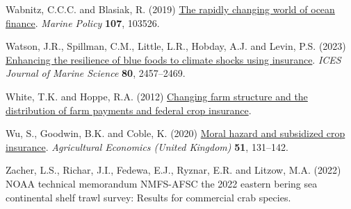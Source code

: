 \documentclass[
  letterpaper,
  DIV=11,
  numbers=noendperiod]{scrartcl}
\newlength{\cslhangindent}
\newlength{\cslentryspacingunit} %
\newenvironment{CSLReferences}[2] %
 {%
  \setlength{\parindent}{0pt}
  \ifodd #1
  \let\oldpar\par
  \def\par{\hangindent=\cslhangindent\oldpar}
  \fi
  \setlength{\parskip}{#2\cslentryspacingunit}
 }%
 {}
\theoremstyle{plain}
\theoremstyle{plain}
\theoremstyle{remark}
\begin{document}
\begin{CSLReferences}{1}{0}
\leavevmode{}%
Wabnitz, C.C.C. and Blasiak, R. (2019)
\href{https://doi.org/10.1016/j.marpol.2019.103526}{The rapidly changing
world of ocean finance}. \emph{Marine Policy} \textbf{107}, 103526.

\leavevmode{}%
Watson, J.R., Spillman, C.M., Little, L.R., Hobday, A.J. and Levin, P.S.
(2023) \href{https://doi.org/10.1093/icesjms/fsad175}{Enhancing the
resilience of blue foods to climate shocks using insurance}. \emph{ICES
Journal of Marine Science} \textbf{80}, 2457--2469.

\leavevmode{}%
White, T.K. and Hoppe, R.A. (2012)
\href{https://www.ers.usda.gov}{Changing farm structure and the
distribution of farm payments and federal crop insurance}.

\leavevmode{}%
Wu, S., Goodwin, B.K. and Coble, K. (2020)
\href{https://doi.org/10.1111/agec.12545}{Moral hazard and subsidized
crop insurance}. \emph{Agricultural Economics (United Kingdom)}
\textbf{51}, 131--142.

\leavevmode{}%
Zacher, L.S., Richar, J.I., Fedewa, E.J., Ryznar, E.R. and Litzow, M.A.
(2022) NOAA technical memorandum NMFS-AFSC the 2022 eastern bering sea
continental shelf trawl survey: Results for commercial crab species.

\end{CSLReferences}
\end{document}
